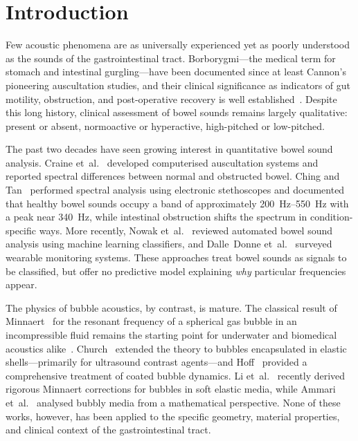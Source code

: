 \documentclass[12pt]{article}
\begin{document}
\bigskip

\section{Introduction}
\label{sec:introduction}

Few acoustic phenomena are as universally experienced yet as poorly understood
as the sounds of the gastrointestinal tract.  Borborygmi---the medical term
for stomach and intestinal gurgling---have been documented since at least
Cannon's~\cite{Cannon1905} pioneering auscultation studies, and their
clinical significance as indicators of gut motility, obstruction, and
post-operative recovery is well established~\cite{Ching2012, Craine1999,
DalleDonne2024}.  Despite this long history, clinical assessment of bowel
sounds remains largely qualitative: present or absent, normoactive or
hyperactive, high-pitched or low-pitched.

The past two decades have seen growing interest in quantitative bowel sound
analysis.  Craine et~al.~\cite{Craine1999, Craine2002} developed
computerised auscultation systems and reported spectral differences between
normal and obstructed bowel.  Ching and Tan~\cite{Ching2012} performed
spectral analysis using electronic stethoscopes and documented that healthy
bowel sounds occupy a band of approximately \SIrange{200}{550}{\hertz} with
a peak near \SI{340}{\hertz}, while intestinal obstruction shifts the
spectrum in condition-specific ways.  More recently, Nowak
et~al.~\cite{Nowak2021} reviewed automated bowel sound analysis using machine
learning classifiers, and Dalle~Donne et~al.~\cite{DalleDonne2024} surveyed
wearable monitoring systems.  These approaches treat bowel sounds as signals
to be classified, but offer no predictive model explaining \emph{why}
particular frequencies appear.

The physics of bubble acoustics, by contrast, is mature.  The
classical result of Minnaert~\cite{Minnaert1933} for the resonant frequency
of a spherical gas bubble in an incompressible fluid remains the starting
point for underwater and biomedical acoustics alike~\cite{Leighton1994}.
Church~\cite{Church1995} extended the theory to bubbles encapsulated in
elastic shells---primarily for ultrasound contrast agents---and
Hoff~\cite{Hoff2001} provided a comprehensive treatment of coated bubble
dynamics.  Li et~al.~\cite{Li2022} recently derived rigorous Minnaert
corrections for bubbles in soft elastic media, while Ammari
et~al.~\cite{Ammari2018} analysed bubbly media from a mathematical
perspective.  None of these works, however, has been applied to the specific
geometry, material properties, and clinical context of the gastrointestinal
tract.
\end{document}
